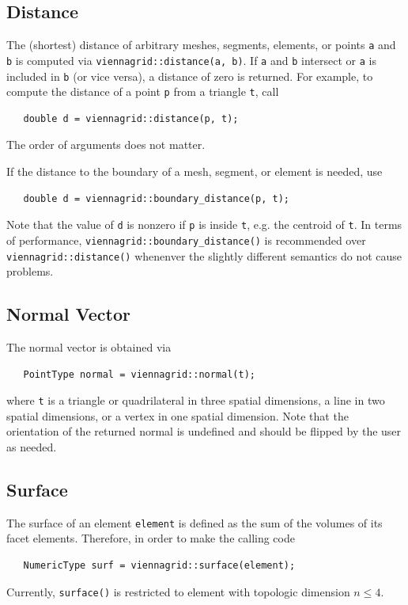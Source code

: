 
  \subsection{Distance}
  The (shortest) distance of arbitrary meshes, segments, elements, or points \lstinline|a| and \lstinline|b| is computed via \lstinline|viennagrid::distance(a, b)|.
  If \lstinline|a| and \lstinline|b| intersect or \lstinline|a| is included in \lstinline|b| (or vice versa), a distance of zero is returned.
  For example, to compute the distance of a point \lstinline|p| from a triangle \lstinline|t|, call
  \begin{lstlisting}
   double d = viennagrid::distance(p, t);
  \end{lstlisting}
  The order of arguments does not matter.

  If the distance to the boundary of a mesh, segment, or element is needed, use
  \begin{lstlisting}
   double d = viennagrid::boundary_distance(p, t);
  \end{lstlisting}
  Note that the value of \lstinline|d| is nonzero if \lstinline|p| is inside \lstinline|t|, e.g. the centroid of \lstinline|t|.
  In terms of performance, \lstinline|viennagrid::boundary_distance()| is recommended over \lstinline|viennagrid::distance()| whenenver the slightly different semantics do not cause problems. 

  \subsection{Normal Vector}
  The normal vector is obtained via
  \begin{lstlisting}
   PointType normal = viennagrid::normal(t);
  \end{lstlisting}
  where \lstinline|t| is a triangle or quadrilateral in three spatial dimensions, a line in two spatial dimensions, or a vertex in one spatial dimension.
  Note that the orientation of the returned normal is undefined and should be flipped by the user as needed.

  \subsection{Surface}
  The surface of an element \lstinline|element| is defined as the sum of the volumes of its facet elements. Therefore, in order to make the calling code
  \begin{lstlisting}
   NumericType surf = viennagrid::surface(element);
  \end{lstlisting}
  Currently, \lstinline|surface()| is restricted to element with topologic dimension $n \leq 4$.

